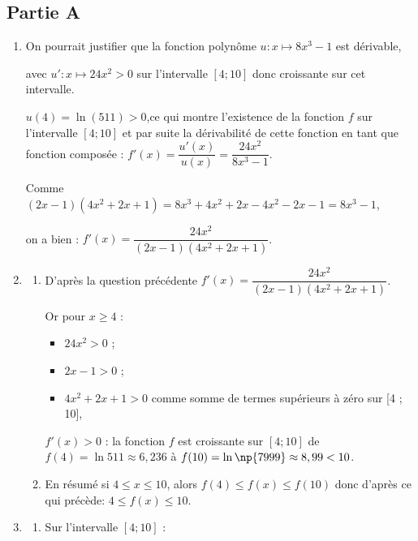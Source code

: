 \subsection*{Partie A}
\begin{enumerate}
	\item On pourrait justifier que la fonction polynôme \quad $u : x \longmapsto 8x^3 -1$ \quad est dérivable,

	avec \quad $u' : x \longmapsto 24 x ^2 > 0$ \quad sur l'intervalle $[4 ; 10]$ donc croissante sur cet intervalle.

	$u(4) = \ln(511) > 0$,\quad ce qui montre l'existence de la fonction $f$ sur l'intervalle $[4 ; 10]$ et par suite la dérivabilité de cette fonction en tant que fonction composée :
	\quad
	$f'(x) = \dfrac{u'(x)}{u(x)} = \dfrac{24x^2}{8x^3 - 1}$.

	Comme \quad $(2x-1)(4x^2+2x+1) = 8x^3 + 4x^2 + 2x - 4x^2 - 2x - 1 = 8x^3 - 1$,

	on a bien : \quad
	$f'(x) = \dfrac{24x^2}{(2x-1)(4x^2+2x+1)}$.

	\item \begin{enumerate}
		\item D'après la question précédente \quad $f'(x) =  \dfrac{24x^2}{(2x-1)(4x^2+2x+1)}$.

		Or pour $x \geqslant 4$ :

		\begin{itemize}
			\item $24x^2 > 0$ ;

			\item $2x - 1 > 0$ ;

			\item $4x^2+2x+1 > 0$ comme somme de termes supérieurs à zéro sur [4 ; 10],\,
		\end{itemize}

		$f'(x) > 0$ : la fonction $f$ est croissante sur $[4 ; 10]$ de $f(4) = \ln 511 \approx 6,236$ à $f(10) = \ln \np{7999} \approx 8,99 < 10$.

		\item En résumé si $4 \leqslant x \leqslant 10$, alors $f(4) \leqslant f(x) \leqslant f(10)$ donc d'après ce qui précède: $4 \leqslant f(x) \leqslant 10$.
	\end{enumerate}

	\item \begin{enumerate}
		\item Sur l'intervalle $[4 ; 10]$ :


\end{enumerate}
\end{enumerate}
